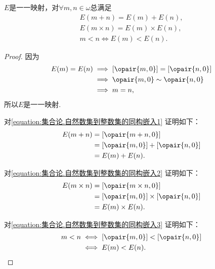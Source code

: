 \begin{theorem}
\(E\)是一一映射，对\(\forall m,n\in\omega\)总满足
\begin{gather}
	E(m+n)=E(m)+E(n),
	\label{equation:集合论.自然数集到整数集的同构嵌入1} \\
	E(m \times n)=E(m) \times E(n),
	\label{equation:集合论.自然数集到整数集的同构嵌入2} \\
	m<n \iff E(m)<E(n).
	\label{equation:集合论.自然数集到整数集的同构嵌入3}
\end{gather}
\begin{proof}
因为\begin{align*}
	E(m)=E(n)
	&\implies
	[\opair{m,0}]=[\opair{n,0}] \\
	&\implies
	\opair{m,0}\sim\opair{n,0} \\
	&\implies
	m=n,
\end{align*}
所以\(E\)是一一映射.

对\cref{equation:集合论.自然数集到整数集的同构嵌入1} 证明如下：
\begin{align*}
	E(m+n)
	&= [\opair{m+n,0}] \\
	&= [\opair{m,0}]+[\opair{n,0}] \\
	&= E(m)+E(n).
\end{align*}

对\cref{equation:集合论.自然数集到整数集的同构嵌入2} 证明如下：
\begin{align*}
	E(m \times n)
	&= [\opair{m \times n,0}] \\
	&= [\opair{m,0}]\times[\opair{n,0}] \\
	&= E(m) \times E(n).
\end{align*}

对\cref{equation:集合论.自然数集到整数集的同构嵌入3} 证明如下：
\begin{align*}
	m<n
	&\iff
	[\opair{m,0}]<[\opair{n,0}] \\
	&\iff
	E(m)<E(n).
	\qedhere
\end{align*}
\end{proof}
\end{theorem}

